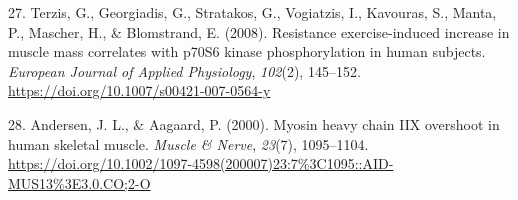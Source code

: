 \documentclass[
  letterpaper,
  DIV=11,
  numbers=noendperiod]{scrreprt}
\newlength{\cslhangindent}
\newenvironment{CSLReferences}[2] %
 {\begin{list}{}{%
  \setlength{\itemindent}{0pt}
  \setlength{\leftmargin}{0pt}
  \setlength{\parsep}{0pt}
  \ifodd #1
   \setlength{\leftmargin}{\cslhangindent}
   \setlength{\itemindent}{-1\cslhangindent}
  \fi
  \setlength{\itemsep}{#2\baselineskip}}}
 {\end{list}}
\begin{document}
\begin{CSLReferences}{1}{0}
27. Terzis, G., Georgiadis, G., Stratakos, G., Vogiatzis, I., Kavouras,
S., Manta, P., Mascher, H., \& Blomstrand, E. (2008). Resistance
exercise-induced increase in muscle mass correlates with p70S6 kinase
phosphorylation in human subjects. \emph{European Journal of Applied
Physiology}, \emph{102}(2), 145--152.
\url{https://doi.org/10.1007/s00421-007-0564-y}

28. Andersen, J. L., \& Aagaard, P. (2000). Myosin heavy chain IIX
overshoot in human skeletal muscle. \emph{Muscle \& Nerve},
\emph{23}(7), 1095--1104.
\url{https://doi.org/10.1002/1097-4598(200007)23:7\%3C1095::AID-MUS13\%3E3.0.CO;2-O}

\end{CSLReferences}
\end{document}
